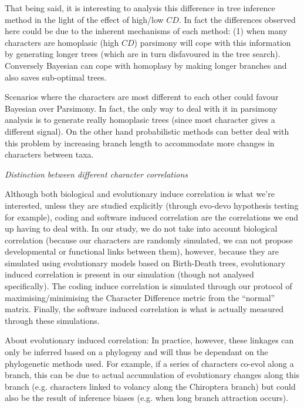 \documentclass[12pt,letterpaper]{article}
\renewcommand{\subsection}[1]{%
\bigskip
\begin{center}
\begin{large}
\normalfont\itshape #1
\end{large}
\end{center}}
\begin{document}
That being said, it is interesting to analysis this difference in tree inference method in the light of the effect of high/low $CD$.
In fact the differences observed here could be due to the inherent mechanisms of each method:
(1) when many characters are homoplasic (high $CD$) parsimony will cope with this information by generating longer trees (which are in turn disfavoured in the tree search). Conversely Bayesian can cope with homoplasy by making longer branches and also saves sub-optimal trees.


Scenarios where the characters are most different to each other could favour Bayesian over Parsimony.
In fact, the only way to deal with it in parsimony analysis is to generate really homoplasic trees (since most character gives a different signal).
On the other hand probabilistic methods can better deal with this problem by increasing branch length to accommodate more changes in characters between taxa.


\subsection{Distinction between different character correlations}
Although both biological and evolutionary induce correlation is what we're interested, unless they are studied explicitly (through evo-devo hypothesis testing for example), coding and software induced correlation are the correlations we end up having to deal with.
In our study, we do not take into account biological correlation (because our characters are randomly simulated, we can not propose developmental or functional links between them), however, because they are simulated using evolutionary models based on Birth-Death trees, evolutionary induced correlation is present in our simulation (though not analysed specifically).
The coding induce correlation is simulated through our protocol of maximising/minimising the Character Difference metric from the ``normal'' matrix.
Finally, the software induced correlation is what is actually measured through these simulations.


About evolutionary induced correlation:
In practice, however, these linkages can only be inferred based on a phylogeny and will thus be dependant on the phylogenetic methods used.
For example, if a series of characters co-evol along a branch, this can be due to actual accumulation of evolutionary changes along this branch (e.g. characters linked to volancy along the Chiroptera branch) but could also be the result of inference biases (e.g. when long branch attraction occurs).
\end{document}
